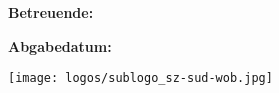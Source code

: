 \begin{titlepage}

    \vfil

    \hspace{1cm}
    \begin{minipage}{\dimexpr\textwidth-1.5cm\relax}
        {\Large\textsf{
            }}

        \vspace{0.5cm}

        {\Large\textsf{
            \textbf{Betreuende:}
        }}

        \vspace{0.5cm}

        {\Large\textsf{
            \textbf{Abgabedatum:} \\\documentDate
        }}
    \end{minipage}

    \vfil


    \enlargethispage{5\baselineskip}

    \texttt{[image: logos/sublogo\_sz-sud-wob.jpg]}


\end{titlepage}

\restoregeometry